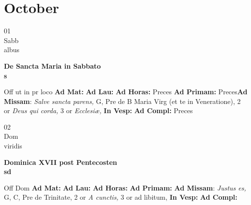\documentclass[10pt, openany]{book}
\begin{document}
    \chapter{October}
                    
    \begin{center}
        \begin{minipage}{3.5in}
            \vspace{2em}
            \begin{minipage}{0.5in}
                {\Huge 01} \\
                {\normalsize Sabb} \\
                {\normalsize albus}
            \end{minipage}
            \begin{minipage}{3.0in}
                \textbf{ \large De Sancta Maria in Sabbato \\
                \textnormal{\normalsize s}} \\ 
            \end{minipage}
            \begin{justify}Off ut in pr loco
                \textbf{Ad Mat: }
                \textbf{Ad Lau: }
                \textbf{Ad Horas: }Preces
                \textbf{Ad Primam: }Preces\textbf{Ad Missam}: \textit{Salve sancta parens,} G, Pre de B Maria Virg (et te in Veneratione), 2 or \textit{Deus qui corda,} 3 or \textit{Ecclesiæ,}  
                \textbf{In Vesp: }
                \textbf{Ad Compl: }Preces
            \end{justify}
        \end{minipage}
    \end{center}

    \begin{center}
        \begin{minipage}{3.5in}
            \vspace{2em}
            \begin{minipage}{0.5in}
                {\Huge 02} \\
                {\normalsize Dom} \\
                {\normalsize viridis}
            \end{minipage}
            \begin{minipage}{3.0in}
                \textbf{ \large Dominica XVII post Pentecosten \\
                \textnormal{\normalsize sd}} \\ 
            \end{minipage}
            \begin{justify}Off Dom
                \textbf{Ad Mat: }
                \textbf{Ad Lau: }
                \textbf{Ad Horas: }
                \textbf{Ad Primam: }\textbf{Ad Missam}: \textit{Justus es,} G, C, Pre de Trinitate, 2 or \textit{A cunctis,} 3 or ad libitum,  
                \textbf{In Vesp: }
                \textbf{Ad Compl: }
            \end{justify}
        \end{minipage}
    \end{center}
\end{document}
